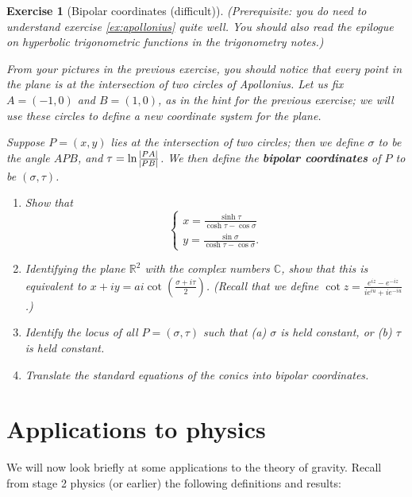 \documentclass[a4paper,leqno,10pt]{article}
\theoremstyle{exercise}
\newtheorem{Exercise}{Exercise}
\newenvironment{exercise}
  {\begin{mdframed}\begin{Exercise}}
  {\end{Exercise}\end{mdframed}}
\theoremstyle{plain}
\theoremstyle{definition}
\theoremstyle{remark}
\newcommand{\df}{\textbf}
\begin{document}
\begin{exercise}[Bipolar coordinates (difficult)]
  (Prerequisite: you do need to understand exercise \ref{ex:apollonius} quite well. You should also read the epilogue on hyperbolic trigonometric
  functions in the trigonometry notes.)

  From your pictures in the previous exercise, you should notice that every point in the plane is at the intersection of two circles of Apollonius.
  Let us fix $ A = (-1, 0) $ and $ B = (1,0) $, as in the hint for the previous exercise; we will use these circles to define a new coordinate system
  for the plane.

  Suppose $ P = (x,y) $ lies at the intersection of two circles; then we define $ \sigma $ to be the angle $ APB $, and $ \tau = \ln \frac{\abs{PA}}{\abs{PB}} $.
  We then define the \df{bipolar coordinates} of $ P $ to be $ (\sigma, \tau) $.
  \begin{enumerate}
    \item Show that
          \begin{displaymath}
            \begin{cases}
              x = \frac{\sinh \tau}{\cosh \tau - \cos \sigma}\\
              y = \frac{\sin \sigma}{\cosh \tau - \cos \sigma}.
            \end{cases}
          \end{displaymath}
    \item Identifying the plane $ \mathbb{R}^2 $ with the complex numbers $ \mathbb{C} $, show that this is
          equivalent to $ x + iy = ai \cot \left(\frac{\sigma + i\tau}{2}\right) $. (Recall that we define $ \cot z = \frac{e^{iz} - e^{-iz}}{ie^{iu} + ie^{-iu}} $.)
    \item Identify the locus of all $ P = (\sigma, \tau) $ such that (a) $ \sigma $ is held constant, or (b) $ \tau $ is held constant.
    \item Translate the standard equations of the conics into bipolar coordinates.
  \end{enumerate}
\end{exercise}

\section{Applications to physics}
We will now look briefly at some applications to the theory of gravity. Recall from stage 2 physics (or earlier)
the following definitions and results:
\end{document}
